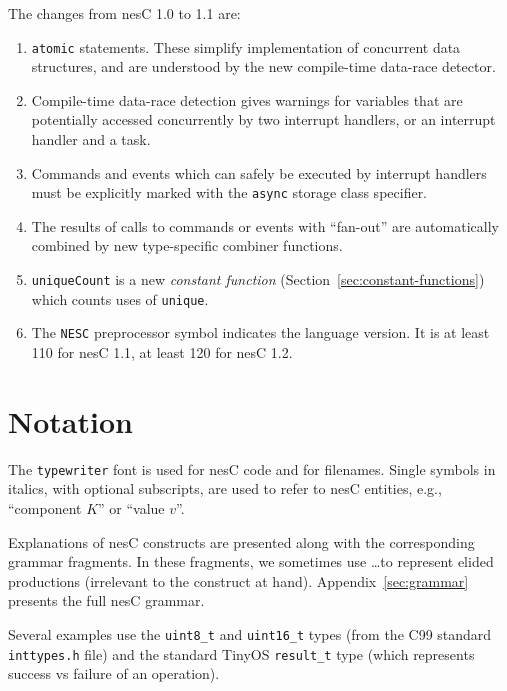 \documentclass[11pt,letterpaper]{article}
\newcommand{\kw}[1]{{\tt #1}}
\newcommand{\code}[1]{{\tt #1}}
\newcommand{\file}[1]{{\tt #1}}
\newcommand{\nesc}{nesC\xspace}
\begin{document}
The changes from \nesc 1.0 to 1.1 are:
\begin{enumerate}
\item \kw{atomic} statements. These simplify implementation of concurrent
data structures, and are understood by the new compile-time data-race
detector.

\item Compile-time data-race detection gives warnings for variables that
are potentially accessed concurrently by two interrupt handlers, or an
interrupt handler and a task.

\item Commands and events which can safely be executed by interrupt
handlers must be explicitly marked with the \kw{async} storage class
specifier.

\item The results of calls to commands or events with ``fan-out'' are
automatically combined by new type-specific combiner functions.

\item \code{uniqueCount} is a new \emph{constant function}
(Section~\ref{sec:constant-functions}) which counts uses of \code{unique}.

\item The \kw{NESC} preprocessor symbol indicates the language version. It
is at least 110 for \nesc 1.1, at least 120 for \nesc 1.2.
 
\end{enumerate}

\section{Notation}
\label{sec:notation}

The \texttt{typewriter} font is used for \nesc code and for
filenames. Single symbols in italics, with optional subscripts, are used to
refer to \nesc entities, e.g., ``component $K$'' or ``value $v$''.

Explanations of \nesc constructs are presented along with the corresponding
grammar fragments. In these fragments, we sometimes use \ldots to represent
elided productions (irrelevant to the construct at
hand). Appendix~\ref{sec:grammar} presents the full \nesc grammar.

Several examples use the \code{uint8\_t} and \code{uint16\_t} types (from
the C99 standard \file{inttypes.h} file) and the standard TinyOS
\code{result\_t} type (which represents success vs failure of an operation).
\end{document}

